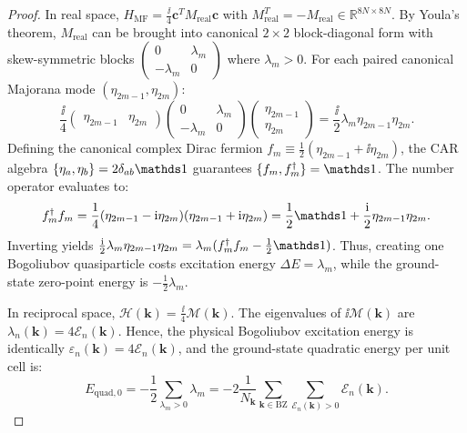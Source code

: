 \begin{proof}
In real space, $H_{\mathrm{MF}} = \frac{\ii}{4} \mathbf{c}^T M_{\mathrm{real}} \mathbf{c}$ with $M_{\mathrm{real}}^T = -M_{\mathrm{real}} \in \mathbb{R}^{8N \times 8N}$. By Youla's theorem, $M_{\mathrm{real}}$ can be brought into canonical $2 \times 2$ block-diagonal form with skew-symmetric blocks $\begin{pmatrix} 0 & \lambda_m \\ -\lambda_m & 0 \end{pmatrix}$ where $\lambda_m > 0$. For each paired canonical Majorana mode $(\eta_{2m-1}, \eta_{2m})$:
\begin{equation}
\frac{\ii}{4} \begin{pmatrix} \eta_{2m-1} & \eta_{2m} \end{pmatrix} \begin{pmatrix} 0 & \lambda_m \\ -\lambda_m & 0 \end{pmatrix} \begin{pmatrix} \eta_{2m-1} \\ \eta_{2m} \end{pmatrix} = \frac{\ii}{2} \lambda_m \eta_{2m-1} \eta_{2m}.
\end{equation}
Defining the canonical complex Dirac fermion $f_m \equiv \frac{1}{2}(\eta_{2m-1} + \ii \eta_{2m})$, the CAR algebra $\{ \eta_a, \eta_b \} = 2\delta_{ab}\Id$ guarantees $\{f_m, f_m^\dagger\} = \Id$. The number operator evaluates to:
\begin{equation}
f_m^\dagger f_m = \frac{1}{4}(\eta_{2m-1} - \ii \eta_{2m})(\eta_{2m-1} + \ii \eta_{2m}) = \frac{1}{2}\Id + \frac{\ii}{2}\eta_{2m-1}\eta_{2m}.
\end{equation}
Inverting yields $\frac{\ii}{2}\lambda_m \eta_{2m-1}\eta_{2m} = \lambda_m(f_m^\dagger f_m - \frac{1}{2}\Id)$. Thus, creating one Bogoliubov quasiparticle costs excitation energy $\Delta E = \lambda_m$, while the ground-state zero-point energy is $-\frac{1}{2}\lambda_m$.

In reciprocal space, $\mathcal{H}(\mathbf{k}) = \frac{\ii}{4}\mathcal{M}(\mathbf{k})$. The eigenvalues of $\ii\mathcal{M}(\mathbf{k})$ are $\lambda_n(\mathbf{k}) = 4\mathcal{E}_n(\mathbf{k})$. Hence, the physical Bogoliubov excitation energy is identically $\varepsilon_n(\mathbf{k}) = 4\mathcal{E}_n(\mathbf{k})$, and the ground-state quadratic energy per unit cell is:
\begin{equation}
E_{\mathrm{quad}, 0} = -\frac{1}{2} \sum_{\lambda_m > 0} \lambda_m = -2 \frac{1}{N_{\mathbf{k}}} \sum_{\mathbf{k} \in \mathrm{BZ}} \sum_{\mathcal{E}_n(\mathbf{k}) > 0} \mathcal{E}_n(\mathbf{k}).
\end{equation}
\end{proof}


